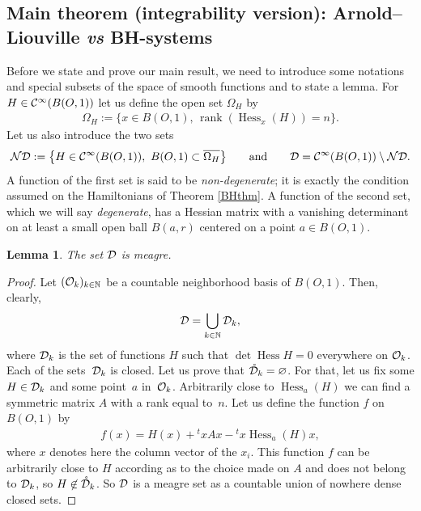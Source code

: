 \documentclass[10pt,a4paper]{amsart}
\numberwithin{equation}{section}
\newtheorem{Lemma}[Theorem]{Lemma}
\begin{document}
\subsection{Main theorem (integrability version): Arnold--Liouville {\it\bfseries vs} BH-systems}

Before we state and prove our main result, we need to introduce some notations and special subsets of the space of smooth functions and to state a lemma.
For $H\in{\cal C}^\infty(B(O,1))$ let us define the open set $\Omega_H$ by
\begin{gather*}
\Omega_H:=\big\{x\in B(O,1),\, \operatorname{rank}(\operatorname{Hess}_x(H))=n\big\}.
\end{gather*}
Let us also introduce the two sets
\begin{gather*}
{\cal ND}:=\big\{H\in {\cal C}^\infty(B(O,1)),\ B(O,1)\subset\overline{\Omega_H}\big\}\qquad \text{and}\qquad {\cal D}={\cal C}^\infty(B(O,1))\setminus{\cal ND}.
\end{gather*}
A function of the first set is said to be {\it non-degenerate}; it is exactly the condition assumed on the Hamiltonians of Theorem \ref{BHthm}. A function of the second set, which we will say {\it degenerate}, has a Hessian matrix with a vanishing determinant on at least a small open ball $B(a,r)$ centered on a point $a\in B(O,1)$.

\begin{Lemma}
	The set ${\cal D}$ is meagre.
\end{Lemma}

\begin{proof}
	Let $({\cal O}_k)_{k\in\mathbb{N}}$ be a countable neighborhood basis of $B(O,1)$. Then, clearly,
\begin{gather*}
{\cal D}=\bigcup_{k\in\mathbb{N}}{\cal D}_k,
\end{gather*}
	where ${\cal D}_k$ is the set of functions $H$ such that $\det\operatorname{Hess}H=0$ everywhere on ${\cal O}_k$. Each of the sets~${\cal D}_k$ is closed. Let us prove that $\mathring{\cal D}_k=\varnothing$. For that, let us fix some
	$H\in{\cal D}_k$ and some point~$a$ in~${\cal O}_k$.
	Arbitrarily close to $\operatorname{Hess}_a(H)$ we can find a symmetric matrix $A$ with a rank equal to~$n$. Let us define the function $f$ on $B(O,1)$ by
\begin{gather*}
f(x)=H(x)+{}^txAx-{}^tx\operatorname{Hess}_a(H)x,
\end{gather*}
	where $x$ denotes here the column vector of the $x_i$.
	This function $f$ can be arbitrarily close to $H$ according as to the choice made on $A$ and does not belong to ${\cal D}_k$, so $H\not\in\mathring{\cal D}_k$. So ${\cal D}$ is a meagre set as a countable union of nowhere dense closed sets.
\end{proof}
\end{document}
